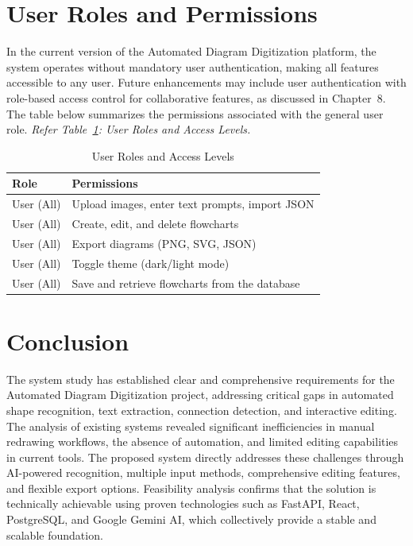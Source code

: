\section{User Roles and Permissions}
\label{sec:roles}

In the current version of the Automated Diagram Digitization 
platform, the system operates without mandatory user authentication, 
making all features accessible to any user. Future enhancements 
may include user authentication with role-based access control for 
collaborative features, as discussed in Chapter~8. The table below 
summarizes the permissions associated with the general user role. 
\textit{Refer Table~\ref{tab:roles}: User Roles and Access Levels.}

\begin{table}[ht]
\centering
\renewcommand{\arraystretch}{1.5}
\begin{tabular}{|l|p{9cm}|}
\hline
\textbf{Role} & \textbf{Permissions} \\
\hline
User (All) & Upload images, enter text prompts, import JSON \\
\hline
User (All) & Create, edit, and delete flowcharts \\
\hline
User (All) & Export diagrams (PNG, SVG, JSON) \\
\hline
User (All) & Toggle theme (dark/light mode) \\
\hline
User (All) & Save and retrieve flowcharts from the database \\
\hline
\end{tabular}
\caption{User Roles and Access Levels}
\label{tab:roles}
\end{table}

\section{Conclusion}
\label{sec:ch3-conclusion}

The system study has established clear and comprehensive requirements 
for the Automated Diagram Digitization project, addressing critical 
gaps in automated shape recognition, text extraction, connection 
detection, and interactive editing. The analysis of existing systems 
revealed significant inefficiencies in manual redrawing workflows, 
the absence of automation, and limited editing capabilities in 
current tools. The proposed system directly addresses these challenges through 
AI-powered recognition, multiple input methods, comprehensive editing 
features, and flexible export options. Feasibility analysis confirms 
that the solution is technically achievable using proven technologies 
such as FastAPI, React, PostgreSQL, and Google Gemini AI, which 
collectively provide a stable and scalable foundation.

